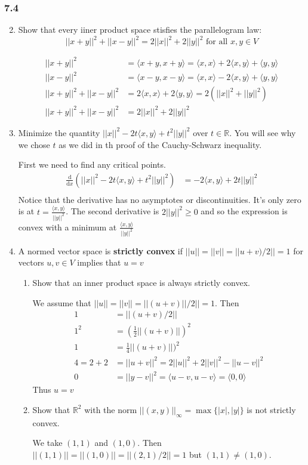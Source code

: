 \documentclass[letterpaper]{article}
\begin{document}
\subsubsection*{7.4}
\begin{enumerate}
\setcounter{enumi}{1}
\item
Show that every iiner product space stisfies the parallelogram law:
\[||x+y||^2+||x-y||^2=2||x||^2+2||y||^2\text{ for all } x,y\in V\]

  \begin{align*}
    ||x+y||^2&=\langle x+y,x+y\rangle=\langle x,x\rangle+2\langle x,y\rangle+\langle y,y\rangle\\
    ||x-y||^2&=\langle x-y,x-y\rangle=\langle x,x\rangle-2\langle x,y\rangle+\langle y,y\rangle\\
    ||x+y||^2+||x-y||^2&=2\langle x,x\rangle+2\langle y,y\rangle=2(||x||^2+||y||^2)\\
    ||x+y||^2+||x-y||^2&=2||x||^2+2||y||^2
  \end{align*}


\item
Minimize the quantity $||x||^2-2t\langle x,y\rangle +t^2||y||^2$ over $t\in \mathbb{R}$. You will see why we chose $t$ as we did in th proof of the Cauchy-Schwarz inequality.

First we need to find any critical points.
\begin{align*}
  \frac{\mathrm{d}}{\mathrm{d}x}\left(||x||^2-2t\langle x,y\rangle +t^2||y||^2\right)&=-2\langle x,y\rangle+2t||y||^2\\
\end{align*}
Notice that the derivative has no asymptotes or discontinuities. It's only zero is at $t=\frac{\langle x,y\rangle}{||y||^2}$. The second derivative is $2||y||^2\ge 0$ and so the expression is convex with a minimum at $\frac{\langle x,y\rangle}{||y||^2}$
\setcounter{enumi}{6}
\item
A normed vector space is {\bf strictly convex} if $||u||=||v||=||u+v)/2||=1$ for vectors $u,v\in V$ implies that $u=v$
\begin{enumerate}
\item
Show that an inner product space is always strictly convex.

We assume that $||u||=||v||=||(u+v)||/2||=1$. Then
\begin{align*}
  1&=||(u+v)/2||\\
  1^2&=(\frac{1}{2}||(u+v)||)^2\\
  1&=\frac{1}{4}||(u+v)||)^2\\
  4=2+2&=||u+v||^2=2||u||^2+2||v||^2-||u-v||^2\\
  0&=||y-v||^2=\langle u-v,u-v\rangle=\langle0,0\rangle
\end{align*}
Thus $u=v$
\item
Show that $\mathbb{R}^2$ with the norm $||(x,y)||_\infty=\max\{|x|,|y|\}$ is not strictly convex.

We take $(1,1)$ and $(1,0)$. Then $||(1,1)||=||(1,0)||=||(2,1)/2||=1$ but $(1,1)\ne (1,0)$.
\end{enumerate}
\end{enumerate}
\end{document}

